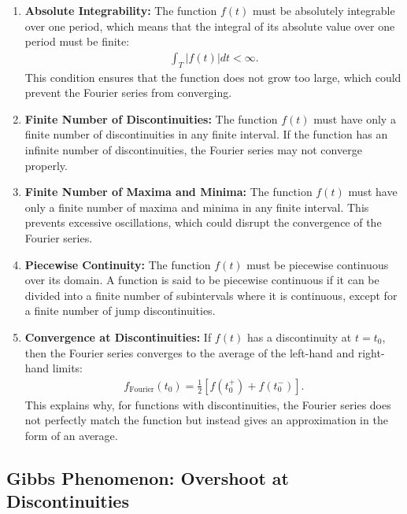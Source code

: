 \documentclass[12pt,a4paper]{report}
\begin{document}
\begin{enumerate}
    \item \textbf{Absolute Integrability:}  
    The function $ f(t) $ must be absolutely integrable over one period, which means that the integral of its absolute value over one period must be finite:
    \begin{align}
    \int_{T} |f(t)| dt < \infty.
    \end{align}
    This condition ensures that the function does not grow too large, which could prevent the Fourier series from converging.

    \item \textbf{Finite Number of Discontinuities:}  
    The function $ f(t) $ must have only a finite number of discontinuities in any finite interval.  
    If the function has an infinite number of discontinuities, the Fourier series may not converge properly.

    \item \textbf{Finite Number of Maxima and Minima:}  
    The function $ f(t) $ must have only a finite number of maxima and minima in any finite interval.  
    This prevents excessive oscillations, which could disrupt the convergence of the Fourier series.

    \item \textbf{Piecewise Continuity:}  
    The function $ f(t) $ must be piecewise continuous over its domain.  
    A function is said to be piecewise continuous if it can be divided into a finite number of subintervals where it is continuous, except for a finite number of jump discontinuities.

    \item \textbf{Convergence at Discontinuities:}  
    If $ f(t) $ has a discontinuity at $ t = t_0 $, then the Fourier series converges to the average of the left-hand and right-hand limits:
    \begin{align}
    f_{\text{Fourier}}(t_0) = \frac{1}{2} \left[ f(t_0^+) + f(t_0^-) \right].
    \end{align}
    This explains why, for functions with discontinuities, the Fourier series does not perfectly match the function but instead gives an approximation in the form of an average.

\end{enumerate}

\subsection{Gibbs Phenomenon: Overshoot at Discontinuities}
\end{document}

